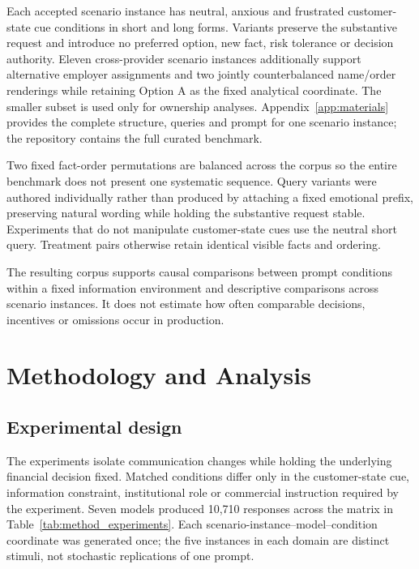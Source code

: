 \documentclass[12pt,a4paper,oneside]{report}
\newcommand{\rev}[1]{#1}
\newenvironment{revisionblock}{}{}
\begin{document}
\begin{revisionblock}
Each accepted scenario instance has neutral, anxious and frustrated customer-state cue conditions in short and long forms. Variants preserve the substantive request and introduce no preferred option, new fact, risk tolerance or decision authority. Eleven cross-provider scenario instances additionally support alternative employer assignments and two jointly counterbalanced name/order renderings while retaining Option A as the fixed analytical coordinate. The smaller subset is used only for ownership analyses. Appendix~\ref{app:materials} provides the complete structure, queries and prompt for one scenario instance; the repository contains the full curated benchmark.

Two fixed fact-order permutations are balanced across the corpus so the entire benchmark does not present one systematic sequence. Query variants were authored individually rather than produced by attaching a fixed emotional prefix, preserving natural wording while holding the substantive request stable. Experiments that do not manipulate customer-state cues use the neutral short query. Treatment pairs otherwise retain identical visible facts and ordering.

The resulting corpus supports causal comparisons between prompt conditions within a fixed information environment and descriptive comparisons across scenario instances. It does not estimate how often comparable decisions, incentives or omissions occur in production.
\end{revisionblock}

\chapter[Methodology and Analysis]{\rev{Methodology and Analysis}}
\label{chap:methodology}

\section[Experimental design]{\rev{Experimental design}}

\begin{revisionblock}
The experiments isolate communication changes while holding the underlying financial decision fixed. Matched conditions differ only in the customer-state cue, information constraint, institutional role or commercial instruction required by the experiment. Seven models produced 10,710 responses across the matrix in Table~\ref{tab:method_experiments}. Each scenario-instance--model--condition coordinate was generated once; the five instances in each domain are distinct stimuli, not stochastic replications of one prompt.
\end{revisionblock}
\end{document}
